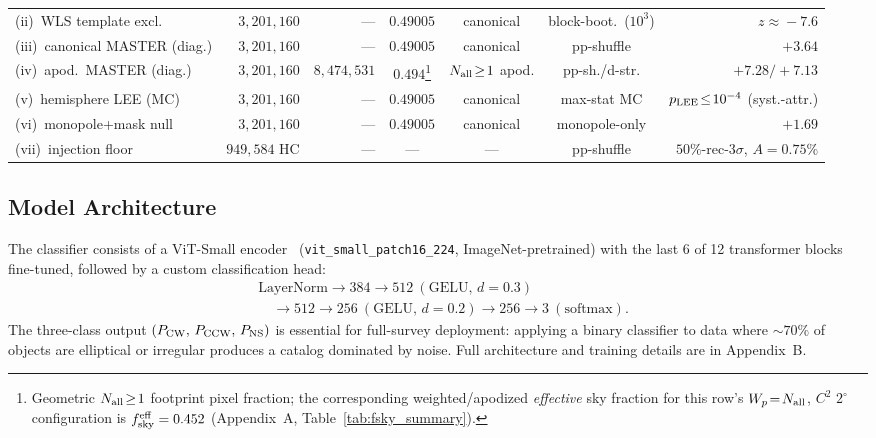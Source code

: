 \documentclass[aps,prd,twocolumn,superscriptaddress,preprintnumbers,nofootinbib,longbibliography,floatfix]{revtex4-2}
\newcommand{\pcw}{P_{\rm CW}}
\newcommand{\pccw}{P_{\rm CCW}}
\newcommand{\pns}{P_{\rm NS}}
\newcommand{\vit}{ViT-Small}
\begin{document}
\begin{table}[t]
\begin{ruledtabular}
\begin{tabular}{lrrcccr}
(ii)~WLS template excl. & $3{,}201{,}160$ & --- & $0.49005$ & canonical & block-boot.\ ($10^3$) & $z\!\approx\!-7.6$ \\
(iii)~canonical MASTER (diag.) & $3{,}201{,}160$ & --- & $0.49005$ & canonical & pp-shuffle & $+3.64$ \\
(iv)~apod.\ MASTER (diag.) & $3{,}201{,}160$ & $8{,}474{,}531$ & $0.494$\footnote{Geometric $N_{\rm all}\!\ge\!1$ footprint pixel fraction; the corresponding weighted/apodized \emph{effective} sky fraction for this row's $W_p\!=\!N_{\rm all}$, $C^2$ $2^\circ$ configuration is $f_{\rm sky}^{\rm eff}=0.452$ (Appendix~A, Table~\ref{tab:fsky_summary}).} & $N_{\rm all}\!\geq\!1$ apod. & pp-sh./d-str. & $+7.28/{+}7.13$ \\
(v)~hemisphere LEE (MC) & $3{,}201{,}160$ & --- & $0.49005$ & canonical & max-stat MC & $p_{\rm LEE}\!\le\!10^{-4}$ (syst.-attr.) \\
(vi)~monopole+mask null & $3{,}201{,}160$ & --- & $0.49005$ & canonical & monopole-only & $+1.69$ \\
(vii)~injection floor & $949{,}584$ HC & --- & --- & --- & pp-shuffle & $50\%$-rec-$3\sigma$, $A\!=\!0.75\%$ \\
\end{tabular}
\end{ruledtabular}
\end{table}

\subsection{Model Architecture}
\label{sec:architecture}

The classifier consists of a \vit{} encoder~\cite{Dosovitskiy:2020} (\texttt{vit\_small\_patch16\_224}, ImageNet-pretrained) with the last 6 of 12 transformer blocks fine-tuned, followed by a custom classification head:
\begin{equation}
\begin{aligned}
&\text{LayerNorm} \to 384{\to}512~(\text{GELU},\,d{=}0.3) \\
&\quad \to 512{\to}256~(\text{GELU},\,d{=}0.2) \to 256{\to}3~(\text{softmax}).
\end{aligned}
\end{equation}
The three-class output $(\pcw,\,\pccw,\,\pns)$ is essential for full-survey deployment: applying a binary classifier to data where $\sim\!70\%$ of objects are elliptical or irregular produces a catalog dominated by noise. Full architecture and training details are in Appendix~B.
\end{document}

